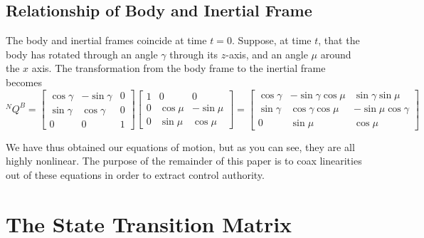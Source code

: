 \documentclass[10pt,letterpaper,final]{article}
\begin{document}
\subsection{Relationship of Body and Inertial Frame}
The body and inertial frames coincide at time $t = 0$. Suppose, at time $t$, that the body has rotated through an angle $\gamma$ through its $z$-axis, and an angle $\mu$ around the $x$ axis. The transformation from the body frame to the inertial frame becomes
$${}^N Q^B = 
\begin{bmatrix}
\cos\gamma & -\sin\gamma & 0 \\
\sin\gamma & \cos\gamma & 0 \\
0 & 0 & 1
\end{bmatrix}
\begin{bmatrix}
1 & 0 & 0 \\
0 & \cos\mu & -\sin\mu \\
0 & \sin\mu & \cos\mu
\end{bmatrix}
=
\begin{bmatrix}
\cos\gamma & -\sin\gamma\cos\mu & \sin\gamma\sin\mu \\
\sin\gamma & \cos\gamma\cos\mu & -\sin\mu\cos\gamma \\
0 & \sin\mu & \cos\mu
\end{bmatrix}$$


We have thus obtained our equations of motion, but as you can see, they are all highly nonlinear. The purpose of the remainder of this paper is to coax linearities out of these equations in order to extract control authority.

\section{The State Transition Matrix}
\end{document}
